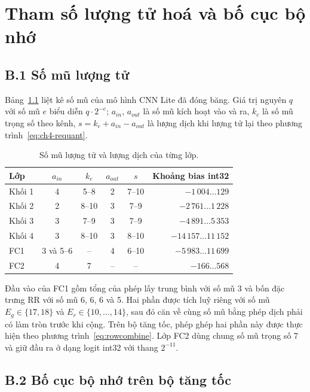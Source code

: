 \chapter{Tham số lượng tử hoá và bố cục bộ nhớ}\label{pl:luongtu}

\section*{B.1 Số mũ lượng tử}

Bảng~\ref{tab:plb-mu} liệt kê số mũ của mô hình CNN Lite đã đóng băng.
Giá trị nguyên $q$ với số mũ $e$ biểu diễn $q\cdot2^{-e}$; $a_{in}$, $a_{out}$ là số mũ kích hoạt vào và ra, $k_c$ là số mũ trọng số theo kênh, $s=k_c+a_{in}-a_{out}$ là lượng dịch khi lượng tử lại theo phương trình~\eqref{eq:ch4-requant}.

\begin{table}[htbp]
  \centering
  \caption{Số mũ lượng tử và lượng dịch của từng lớp.}\label{tab:plb-mu}
  \begin{tabular}{lccccr}
    \toprule
    Lớp & $a_{in}$ & $k_c$ & $a_{out}$ & $s$ & Khoảng bias int32 \\
    \midrule
    Khối 1 & 4 & 5--8  & 2 & 7--10 & $-1\,004\ldots129$ \\
    Khối 2 & 2 & 8--10 & 3 & 7--9  & $-2\,761\ldots1\,228$ \\
    Khối 3 & 3 & 7--9  & 3 & 7--9  & $-4\,891\ldots5\,353$ \\
    Khối 4 & 3 & 8--10 & 3 & 8--10 & $-14\,157\ldots11\,152$ \\
    FC1 & 3 và 5--6 & -- & 4 & 6--10 & $-5\,983\ldots11\,699$ \\
    FC2 & 4 & 7 & -- & -- & $-166\ldots568$ \\
    \bottomrule
  \end{tabular}
\end{table}

Đầu vào của FC1 gồm tổng của phép lấy trung bình với số mũ 3 và bốn đặc trưng RR với số mũ 6, 6, 6 và 5.
Hai phần được tích luỹ riêng với số mũ $E_g\in\{17,18\}$ và $E_r\in\{10,\ldots,14\}$, sau đó căn về cùng số mũ bằng phép dịch phải có làm tròn trước khi cộng.
Trên bộ tăng tốc, phép ghép hai phần này được thực hiện theo phương trình~\eqref{eq:rowcombine}.
Lớp FC2 dùng chung số mũ trọng số 7 và giữ đầu ra ở dạng logit int32 với thang $2^{-11}$.

\section*{B.2 Bố cục bộ nhớ trên bộ tăng tốc}

